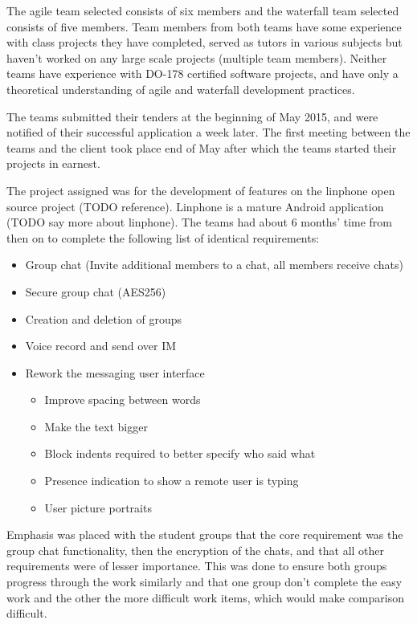 \documentclass{sig-alternate-05-2015}
\begin{document}
The agile team selected consists of six members and the waterfall team selected consists of five members. Team members from both teams have some experience with class projects they have completed, served as tutors in various subjects but haven't worked on any large scale projects (multiple team members). Neither teams have experience with DO-178 certified software projects, and have only a theoretical understanding of agile and waterfall development practices.  

The teams submitted their tenders at the beginning of May 2015, and were notified of their successful application a week later. The first meeting between the teams and the client took place end of May after which the teams started their projects in earnest. 


The project  assigned was for the development of features on the linphone open source project (TODO reference). Linphone is a mature Android application (TODO say more about linphone). The teams had about 6 months' time from then on to complete the following list of identical requirements:
\\
\begin{itemize}
	\item Group chat (Invite additional members to a chat, all members receive chats)
	\item Secure group chat (AES256)
	\item Creation and deletion of groups
	\item Voice record and send over IM
	\item Rework the messaging user interface
	\begin{itemize}
		\item Improve spacing between words
		\item Make the text bigger
		\item Block indents required to better specify who said what
		\item Presence indication to show a remote user is typing
		\item User picture portraits
	\end{itemize}
\end{itemize}

Emphasis was placed with the student groups that the core requirement was the group chat functionality, then the encryption of the chats, and that all other requirements were of lesser importance. This was done to ensure both groups progress through the work similarly and that one group don't complete the easy work and the other the more difficult work items, which would make comparison difficult.  
\end{document}
